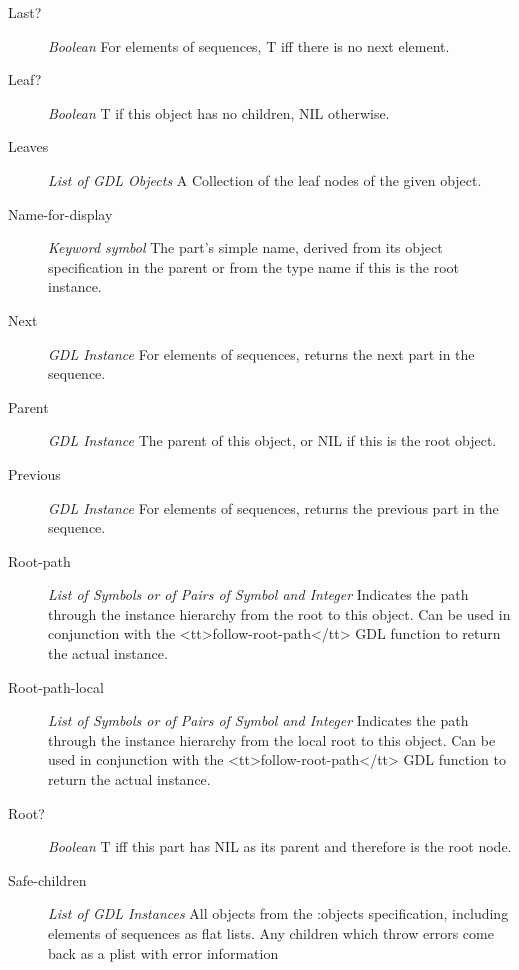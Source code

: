 \documentclass [11pt]{book}
\begin{document}
\begin{itemize}
\begin{description}
\item [Last?]
\emph{Boolean} For elements of sequences, T iff there is no next element.


\item [Leaf?]
\emph{Boolean} T if this object has no children, NIL otherwise.


\item [Leaves]
\emph{List of GDL Objects} A Collection of the leaf nodes of the given object.


\item [Name-for-display]
\emph{Keyword symbol} The part's simple name, derived from its object specification in the parent or from
the type name if this is the root instance.


\item [Next]
\emph{GDL Instance} For elements of sequences, returns the next part in the sequence.


\item [Parent]
\emph{GDL Instance} The parent of this object, or NIL if this is the root object.


\item [Previous]
\emph{GDL Instance} For elements of sequences, returns the previous part in the sequence.


\item [Root-path]
\emph{List of Symbols or of Pairs of Symbol and Integer} Indicates the path through
the instance hierarchy from the root to this object. Can be used in conjunction with
the <tt>follow-root-path</tt> GDL function to return the actual instance.


\item [Root-path-local]
\emph{List of Symbols or of Pairs of Symbol and Integer} Indicates the path through
the instance hierarchy from the local root to this object. Can be used in conjunction with
the <tt>follow-root-path</tt> GDL function to return the actual instance.


\item [Root?]
\emph{Boolean} T iff this part has NIL as its parent and therefore is the root node.


\item [Safe-children]
\emph{List of GDL Instances} All objects from the :objects specification, including elements of sequences
as flat lists. Any children which throw errors come back as a plist with error information



\end{description}
\end{itemize}
\end{document}
